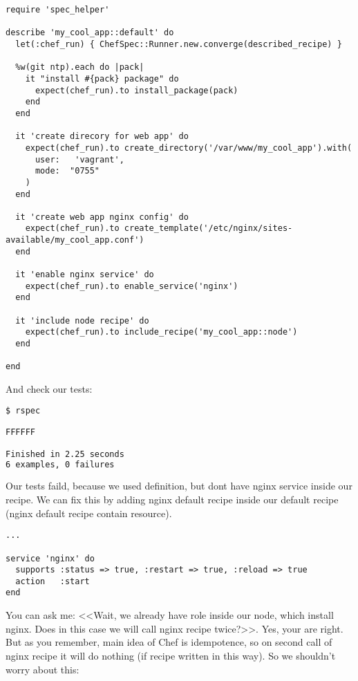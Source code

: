 \begin{lstlisting}[label=lst:testing-chefspec3,title=my-server-cloud/site-cookbooks/my\_cool\_app/spec/unit/recipes/default\_spec.rb]
require 'spec_helper'

describe 'my_cool_app::default' do
  let(:chef_run) { ChefSpec::Runner.new.converge(described_recipe) }

  %w(git ntp).each do |pack|
    it "install #{pack} package" do
      expect(chef_run).to install_package(pack)
    end
  end

  it 'create direcory for web app' do
    expect(chef_run).to create_directory('/var/www/my_cool_app').with(
      user:   'vagrant',
      mode:  "0755"
    )
  end

  it 'create web app nginx config' do
    expect(chef_run).to create_template('/etc/nginx/sites-available/my_cool_app.conf')
  end

  it 'enable nginx service' do
    expect(chef_run).to enable_service('nginx')
  end

  it 'include node recipe' do
    expect(chef_run).to include_recipe('my_cool_app::node')
  end

end
\end{lstlisting}

And check our tests:

\begin{lstlisting}[language=Bash,label=lst:testing-chefspec5]
$ rspec

FFFFFF

Finished in 2.25 seconds
6 examples, 0 failures
\end{lstlisting}

Our tests faild, because we used  definition, but dont have nginx service inside our recipe. We can fix this by adding nginx default recipe inside our default recipe (nginx default recipe contain  resource).

\begin{lstlisting}[label=lst:testing-chefspec-nginx]
...

service 'nginx' do
  supports :status => true, :restart => true, :reload => true
  action   :start
end
\end{lstlisting}

You can ask me: <<Wait, we already have role  inside our node, which install nginx. Does in this case we will call nginx recipe twice?>>. Yes, your are right. But as you remember, main idea of Chef is idempotence, so on second call of nginx recipe it will do nothing (if recipe written in this way). So we shouldn't worry about this:

